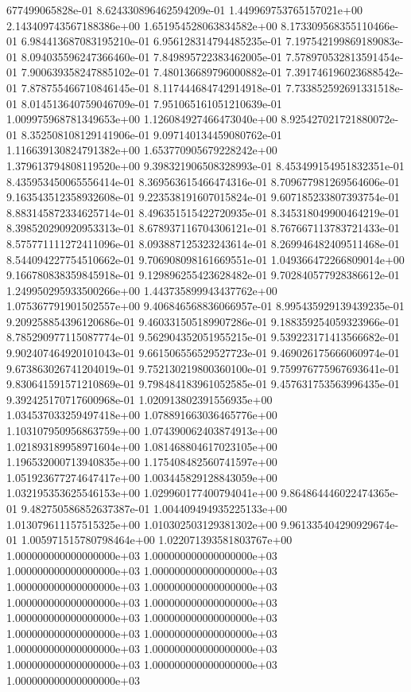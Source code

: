 677499065828e-01	8.624330896462594209e-01	1.449969753765157021e+00	2.143409743567188386e+00	1.651954528063834582e+00	8.173309568355110466e-01	6.984413687083195210e-01	6.956128314794485235e-01	7.197542199869189083e-01	8.094035596247366460e-01	7.849895722383462005e-01	7.578970532813591454e-01	7.900639358247885102e-01	7.480136689796000882e-01	7.391746196023688542e-01	7.878755466710846145e-01	8.117444684742914918e-01	7.733852592691331518e-01	8.014513640759046709e-01	7.951065161051210639e-01	1.009975968781349653e+00	1.126084927466473040e+00	8.925427021721880072e-01	8.352508108129141906e-01	9.097140134459080762e-01	1.116639130824791382e+00	1.653770905679228242e+00	1.379613794808119520e+00	9.398321906508328993e-01	8.453499154951832351e-01	8.435953450065556414e-01	8.369563615466474316e-01	8.709677981269564606e-01	9.163543512358932608e-01	9.223538191607015824e-01	9.607185233807393754e-01	8.883145872334625714e-01	8.496351515422720935e-01	8.345318049900464219e-01	8.398520290920953313e-01	8.678937116704306121e-01	8.767667113783721433e-01	8.575771111272411096e-01	8.093887125323243614e-01	8.269946482409511468e-01	8.544094227754510662e-01	9.706908098161669551e-01	1.049366472266809014e+00	9.166780838359845918e-01	9.129896255423628482e-01	9.702840577928386612e-01	1.249950295933500266e+00	1.443735899943437762e+00	1.075367791901502557e+00	9.406846568836066957e-01	8.995435929139439235e-01	9.209258854396120686e-01	9.460331505189907286e-01	9.188359254059323966e-01	8.785290977115087774e-01	9.562904352051955215e-01	9.539223171413566682e-01	9.902407464920101043e-01	9.661506556529527723e-01	9.469026175666060974e-01	9.673863026741204019e-01	9.752130219800360100e-01	9.759976775967693641e-01	9.830641591571210869e-01	9.798484183961052585e-01	9.457631753563996435e-01	9.392425170717600968e-01	1.020913802391556935e+00	1.034537033259497418e+00	1.078891663036465776e+00	1.103107950956863759e+00	1.074390062403874913e+00	1.021893189958971604e+00	1.081468804617023105e+00	1.196532000713940835e+00	1.175408482560741597e+00	1.051923677274647417e+00	1.003445829128843059e+00	1.032195353625546153e+00	1.029960177400794041e+00	9.864864446022474365e-01	9.482750586852637387e-01	1.004409494935225133e+00	1.013079611157515325e+00	1.010302503129381302e+00	9.961335404290929674e-01	1.005971515780798464e+00	1.022071393581803767e+00	1.000000000000000000e+03	1.000000000000000000e+03	1.000000000000000000e+03	1.000000000000000000e+03	1.000000000000000000e+03	1.000000000000000000e+03	1.000000000000000000e+03	1.000000000000000000e+03	1.000000000000000000e+03	1.000000000000000000e+03	1.000000000000000000e+03	1.000000000000000000e+03	1.000000000000000000e+03	1.000000000000000000e+03	1.000000000000000000e+03	1.000000000000000000e+03	1.000000000000000000e+03
